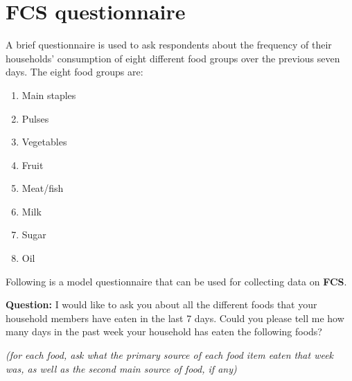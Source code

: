 \documentclass[12pt,]{book}
\providecommand{\tightlist}{%
  \setlength{\itemsep}{0pt}\setlength{\parskip}{0pt}}
\theoremstyle{definition}
\theoremstyle{definition}
\theoremstyle{definition}
\theoremstyle{remark}
\begin{document}
\hypertarget{fcs-questionnaire}{%
\section{FCS questionnaire}\label{fcs-questionnaire}}

A brief questionnaire is used to ask respondents about the frequency of
their households' consumption of eight different food groups over the
previous seven days. The eight food groups are:

\begin{enumerate}
\def\labelenumi{\arabic{enumi}.}
\tightlist
\item
  Main staples
\item
  Pulses
\item
  Vegetables
\item
  Fruit
\item
  Meat/fish
\item
  Milk
\item
  Sugar
\item
  Oil
\end{enumerate}

Following is a model questionnaire that can be used for collecting data
on \textbf{FCS}.

\textbf{Question:} I would like to ask you about all the different foods
that your household members have eaten in the last 7 days. Could you
please tell me how many days in the past week your household has eaten
the following foods?

\emph{(for each food, ask what the primary source of each food item
eaten that week was, as well as the second main source of food, if any)}
\end{document}
